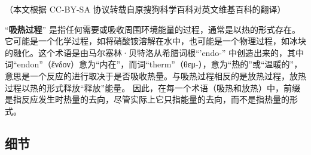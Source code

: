 
（本文根据 CC-BY-SA 协议转载自原搜狗科学百科对英文维基百科的翻译）

“\textbf{吸热过程}” 是指任何需要或吸收周围环境能量的过程，通常是以热的形式存在。它可能是一个化学过程，如将硝酸铵溶解在水中，也可能是一个物理过程，如冰块的融化。这个术语是由马尔塞林·贝特洛从希腊词根“'endo-” 中创造出来的，其中词“endon”（ἔνδον）意为“内在”，而词“therm”（θεμ-），意为“热的”或“温暖的”，意思是一个反应的进行取决于是否吸收热量。与吸热过程相反的是放热过程，放热过程以热的形式释放“释放”能量。 因此，在每一个术语（吸热和放热）中，前缀是指反应发生时热量的去向，尽管实际上它只指能量的去向，而不是指热量的形式。

\subsection{细节}
